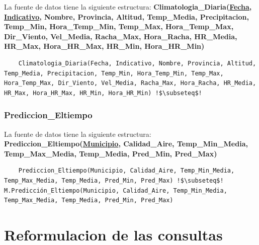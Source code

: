 \documentclass[12pt, a4paper]{article}
\begin{document}
La fuente de datos tiene la siguiente estructura:
\textbf{Climatologia\_Diaria(\underline{Fecha, Indicativo}, Nombre, Provincia, Altitud, Temp\_Media, Precipitacion, Temp\_Min, Hora\_Temp\_Min, Temp\_Max, Hora\_Temp\_Max, Dir\_Viento, Vel\_Media, Racha\_Max, Hora\_Racha, HR\_Media, HR\_Max, Hora\_HR\_Max, HR\_Min, Hora\_HR\_Min)}


\begin{lstlisting}
    Climatologia_Diaria(Fecha, Indicativo, Nombre, Provincia, Altitud, Temp_Media, Precipitacion, Temp_Min, Hora_Temp_Min, Temp_Max, Hora_Temp_Max, Dir_Viento, Vel_Media, Racha_Max, Hora_Racha, HR_Media, HR_Max, Hora_HR_Max, HR_Min, Hora_HR_Min) !$\subseteq$!
\end{lstlisting}

\subsubsection{Prediccion\_Eltiempo}

La fuente de datos tiene la siguiente estructura:
\textbf{Prediccion\_Eltiempo(\underline{Municipio}, Calidad\_Aire, Temp\_Min\_Media, Temp\_Max\_Media, Temp\_Media, Pred\_Min, Pred\_Max)}

\begin{lstlisting}
    Prediccion_Eltiempo(Municipio, Calidad_Aire, Temp_Min_Media, Temp_Max_Media, Temp_Media, Pred_Min, Pred_Max) !$\subseteq$!
M.Predicción_Eltiempo(Municipio, Calidad_Aire, Temp_Min_Media, Temp_Max_Media, Temp_Media, Pred_Min, Pred_Max)
\end{lstlisting}

\section{Reformulacion de las consultas}
\end{document}
